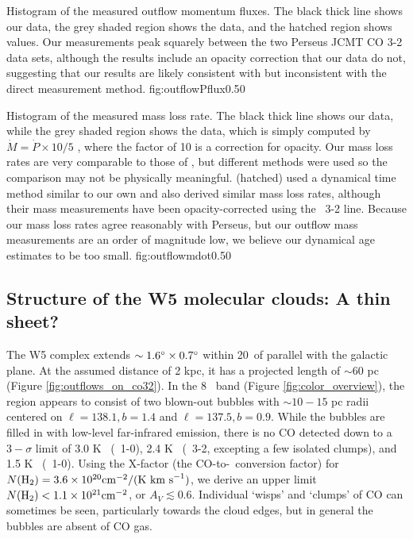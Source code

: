 {Histogram of the measured outflow momentum fluxes.  The black thick line shows
our data, the grey shaded region shows the \citet{hatchell2007} data, and the
hatched region shows \citet{curtis2010} values.  Our measurements peak squarely
between the two Perseus JCMT CO 3-2 data sets, although the \citet{curtis2010}
results include an opacity correction that our data do not, suggesting that our
results are likely consistent with \citet{curtis2010} but inconsistent with the
\citet{hatchell2007} direct measurement method.}
{fig:outflowPflux}{0.5}{0}

{Histogram of the measured mass loss rate.  The black thick line shows our
data, while the grey shaded region shows the \citet{hatchell2007} data, which
is simply computed by $\dot{M} = \dot{P} \times 10 / 5$ \kms, where the factor
of 10 is a correction for opacity.  Our mass loss rates are very comparable to
those of \citet{hatchell2007}, but different methods were used so the
comparison may not be physically meaningful.  \citet{curtis2010} (hatched) used
a dynamical time method similar to our own and also derived similar mass loss
rates, although their mass measurements have been opacity-corrected using the
\thirteenco\ 3-2 line.  Because our mass loss rates agree reasonably with
Perseus, but our outflow mass measurements are an order of magnitude low, we
believe our dynamical age estimates to be too small.
}
{fig:outflowmdot}{0.5}{0}


\subsection{Structure of the W5 molecular clouds: A thin sheet?}
The W5 complex extends $\sim 1.6\mbox{$^\circ$} \times 0.7 \mbox{$^\circ$}$ within 20\arcdeg\
of parallel with the galactic plane.  At the assumed distance of 2 kpc, it has
a projected length of $\sim60$ pc (Figure \ref{fig:outflows_on_co32}).
In the 8 \um\ band (Figure \ref{fig:color_overview}), the region appears to
consist of two blown-out bubbles with $\sim 10-15$ pc radii centered on
$\ell=138.1, b=1.4$ and $\ell=137.5,b=0.9$.  While the bubbles are filled in
with low-level far-infrared emission, there is no CO detected down to a
$3-\sigma$ limit of 3.0 K \kms\ (\twelveco\ 1-0), 2.4 K \kms\ (\twelveco\ 3-2,
excepting a few isolated clumps), and 1.5 K \kms\ (\thirteenco\ 1-0).  Using the 
X-factor (the CO-to-\hh\ conversion factor) for \twelveco\, $N(\textrm{H}_{2}) =
3.6\times10^{20} \textrm{cm}^{-2} / (\mathrm{K}~\textrm{km~s}^{-1})$, we derive an upper limit $N(\textrm{H}_{2}) <
1.1\times10^{21}\textrm{cm}^{-2}$, or $A_V \lesssim 0.6$.  Individual `wisps' and `clumps' of
CO can sometimes be seen, particularly towards the cloud edges, but in general
the bubbles are absent of CO gas.

